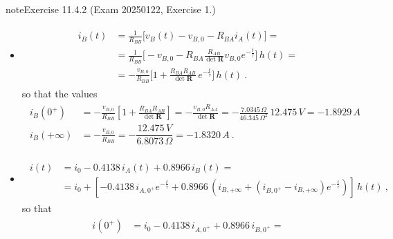 \documentclass[letterpaper,10pt,english]{jupyterBook}
\begin{document}
\begin{sphinxadmonition}{note}{Exercise 11.4.2 (Exam 2025\sphinxhyphen{}01\sphinxhyphen{}22, Exercise 1.)}
\begin{itemize}
\item {} 
\sphinxAtStartPar
{}
\begin{equation*}
\begin{split}\begin{aligned}
     i_B(t) 
     & = \frac{1}{R_{BB}} \bigg[ v_B(t) - v_{B,0} - R_{BA} i_A(t) \bigg] = \\
     & = \frac{1}{R_{BB}} \bigg[ - v_{B,0} - R_{BA} \frac{R_{AB}}{\det \mathbf{R}} v_{B,0} e^{-\frac{t}{\tau}} \bigg] \, h(t) = \\
     & = - \frac{v_{B,0}}{R_{BB}} \bigg[ 1 + \frac{R_{BA} R_{AB}}{\det \mathbf{R}} \, e^{-\frac{t}{\tau}} \bigg] \, h(t) \ .
   \end{aligned}\end{split}
\end{equation*}
\sphinxAtStartPar
so that the values
\begin{equation*}
\begin{split}\begin{aligned}
     i_B(0^+)     & = -\frac{v_{B,0}}{R_{BB}} \left[ 1 + \frac{R_{BA} R_{AB}}{\det \mathbf{R}} \right] = -\frac{v_{B,0} R_{AA}}{\det \mathbf{R}} =  - \frac{7.0345 \, \Omega}{46.345 \, \Omega^2} \, 12.475 \, V = - 1.8929 \, A \\
     i_B(+\infty) & = -\frac{v_{B,0}}{R_{BB}} = - \dfrac{12.475 \, V}{6.8073 \, \Omega} = -1.8320 \, A \ .
   \end{aligned}\end{split}
\end{equation*}
\item {} 
\sphinxAtStartPar
{}
\begin{equation*}
\begin{split}\begin{aligned}
     i(t)
     & = i_{0} - 0.4138 \, i_A(t) + 0.8966 \, i_B(t) = \\
     & = i_{0} + \left[ - 0.4138 \, i_{A,0^+} e^{-\frac{t}{\tau}}  + 0.8966 \, \left( i_{B,+\infty} + (i_{B,0^+} - i_{B,+\infty}) e^{-\frac{t}{\tau}} \right) \right] \, h(t) \ ,
   \end{aligned}\end{split}
\end{equation*}
\sphinxAtStartPar
so that
\begin{equation*}
\begin{split}\begin{aligned}
     i(0^+)     & = i_{0} - 0.4138 \, i_{A,0^+} + 0.8966 \, i_{B,0^+} = \\

\end{aligned}
\end{split}
\end{equation*}
\end{itemize}
\end{sphinxadmonition}
\end{document}
